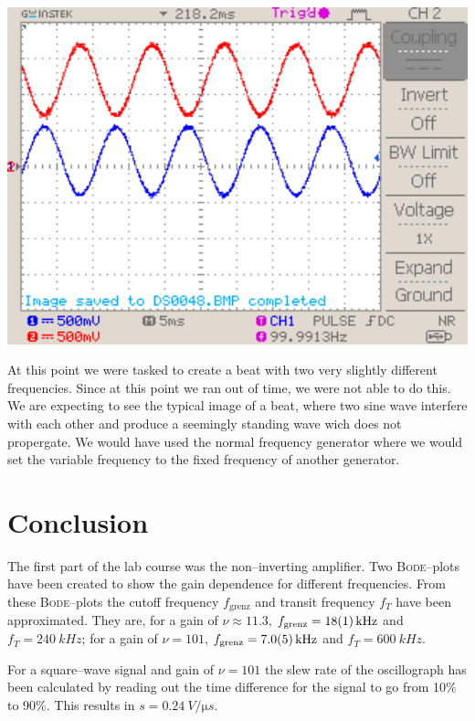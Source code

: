 \documentclass[a4paper,10pt]{article}
\newenvironment{Figure}
        {\par\medskip\noindent\minipage{\linewidth}}
        {\endminipage\par\medskip}
\numberwithin{equation}{section}
\begin{document}
\begin{multicols}{2}
\begin{Figure}
		\label{fig:damp2}
	\end{Figure}
	\begin{Figure}
		\centering
		\includegraphics[width=1\textwidth]{../data/DS0049_n.png}
		\label{fig:damp3}
	\end{Figure}

	At this point we were tasked to create a beat with two very slightly different frequencies. Since at this point we ran out of time, we were not able to do this. We are expecting to see the typical image of a beat, where two sine wave interfere with each other and produce a seemingly standing wave wich does not propergate. We would have used the normal frequency generator where we would set the variable frequency to the fixed frequency of another generator.
	\section{Conclusion}
        The first part of the lab course was the non--inverting amplifier.
        Two \textsc{Bode}--plots have been created to show the gain dependence for different frequencies.
        From these \textsc{Bode}--plots the cutoff frequency $f_\text{grenz}$ and transit frequency $f_T$ have been approximated.
        They are, for a gain of $\nu \approx 11.3$, $f_\text{grenz}=\SI{18+-1}{kHz}$ and $f_T=\SI{240}{kHz}$; for a gain of $\nu =101$, $f_\text{grenz}=\SI{7.0+-0.5}{kHz}$ and $f_T=\SI{600}{kHz}$.

        For a square--wave signal and gain of $\nu =101$ the slew rate of the oscillograph has been calculated by reading out the time difference for the signal to go from 10\% to 90\%.
        This results in $s=\SI{0.24}{V/\micro s}$.


\end{multicols}
\end{document}
